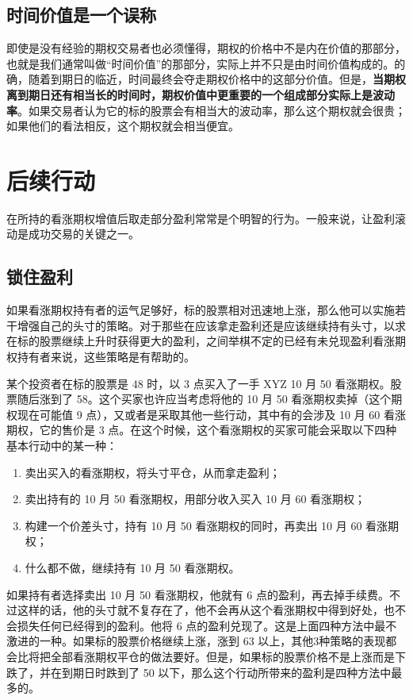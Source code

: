 \subsection*{时间价值是一个误称}
即使是没有经验的期权交易者也必须懂得，期权的价格中不是内在价值的那部分，也就是我们通常叫做“时间价值”的那部分，实际上并不只是由时间价值构成的。的确，随着到期日的临近，时间最终会夺走期权价格中的这部分价值。但是，\textbf{当期权离到期日还有相当长的时间时，期权价值中更重要的一个组成部分实际上是波动率}。如果交易者认为它的标的股票会有相当大的波动率，那么这个期权就会很贵；如果他们的看法相反，这个期权就会相当便宜。
\section{后续行动}
在所持的看涨期权增值后取走部分盈利常常是个明智的行为。一般来说，让盈利滚动是成功交易的关键之一。
\subsection*{锁住盈利}
如果看涨期权持有者的运气足够好，标的股票相对迅速地上涨，那么他可以实施若干增强自己的头寸的策略。对于那些在应该拿走盈利还是应该继续持有头寸，以求在标的股票继续上升时获得更大的盈利，之间举棋不定的已经有未兑现盈利看涨期权持有者来说，这些策略是有帮助的。

某个投资者在标的股票是 48 时，以 3 点买入了一手 XYZ 10 月 50 看涨期权。股票随后涨到了 58。这个买家也许应当考虑将他的 10 月 50 看涨期权卖掉（这个期权现在可能值 9 点），又或者是采取其他一些行动，其中有的会涉及 10 月 60 看涨期权，它的售价是 3 点。在这个时候，这个看涨期权的买家可能会采取以下四种基本行动中的某一种：
\begin{enumerate}
    \item 卖出买入的看涨期权，将头寸平仓，从而拿走盈利；
    \item 卖出持有的 10 月 50 看涨期权，用部分收入买入 10 月 60 看涨期权；
    \item 构建一个价差头寸，持有 10 月 50 看涨期权的同时，再卖出 10 月 60 看涨期权；
    \item 什么都不做，继续持有 10 月 50 看涨期权。
\end{enumerate}

如果持有者选择卖出 10 月 50 看涨期权，他就有 6 点的盈利，再去掉手续费。不过这样的话，他的头寸就不复存在了，他不会再从这个看涨期权中得到好处，也不会损失任何已经得到的盈利。他将 6 点的盈利兑现了。这是上面四种方法中最不激进的一种。如果标的股票价格继续上涨，涨到 63 以上，其他3种策略的表现都会比将把全部看涨期权平仓的做法要好。但是，如果标的股票价格不是上涨而是下跌了，并在到期日时跌到了 50 以下，那么这个行动所带来的盈利是四种方法中最多的。

